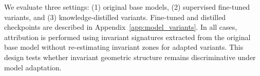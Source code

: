 We evaluate three settings: (1) original base models, (2) supervised fine-tuned variants, and (3) knowledge-distilled variants. Fine-tuned and distilled checkpoints are described in Appendix~\ref{app:model_variants}. In all cases, attribution is performed using invariant signatures extracted from the original base model without re-estimating invariant zones for adapted variants. This design tests whether invariant geometric structure remains discriminative under model adaptation.









